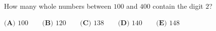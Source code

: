 How many whole numbers between $100$ and $400$ contain the digit $2$?

$\textbf{(A) }100\qquad\textbf{(B) }120\qquad\textbf{(C) }138\qquad\textbf{(D) }140\qquad\textbf{(E) }148$
